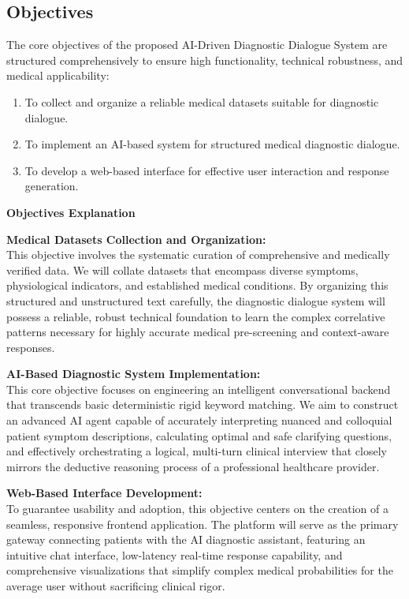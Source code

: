\documentclass[12pt]{article}
\begin{document}
\subsection{Objectives}
The core objectives of the proposed AI-Driven Diagnostic Dialogue System are structured comprehensively to ensure high functionality, technical robustness, and medical applicability:
\begin{enumerate}
    \item To collect and organize a reliable medical datasets suitable for diagnostic dialogue.
    \item To implement an AI-based system for structured medical diagnostic dialogue.
    \item To develop a web-based interface for effective user interaction and response generation.
\end{enumerate}

\newpage
\noindent
{\Large \textbf{Objectives Explanation}}
\vspace{0.5cm}

\noindent
\textbf{Medical Datasets Collection and Organization:}\\
This objective involves the systematic curation of comprehensive and medically verified data. We will collate datasets that encompass diverse symptoms, physiological indicators, and established medical conditions. By organizing this structured and unstructured text carefully, the diagnostic dialogue system will possess a reliable, robust technical foundation to learn the complex correlative patterns necessary for highly accurate medical pre-screening and context-aware responses.
\vspace{0.3cm}
    
\noindent
\textbf{AI-Based Diagnostic System Implementation:}\\
This core objective focuses on engineering an intelligent conversational backend that transcends basic deterministic rigid keyword matching. We aim to construct an advanced AI agent capable of accurately interpreting nuanced and colloquial patient symptom descriptions, calculating optimal and safe clarifying questions, and effectively orchestrating a logical, multi-turn clinical interview that closely mirrors the deductive reasoning process of a professional healthcare provider.
\vspace{0.3cm}

\noindent
\textbf{Web-Based Interface Development:}\\
To guarantee usability and adoption, this objective centers on the creation of a seamless, responsive frontend application. The platform will serve as the primary gateway connecting patients with the AI diagnostic assistant, featuring an intuitive chat interface, low-latency real-time response capability, and comprehensive visualizations that simplify complex medical probabilities for the average user without sacrificing clinical rigor.
\end{document}
